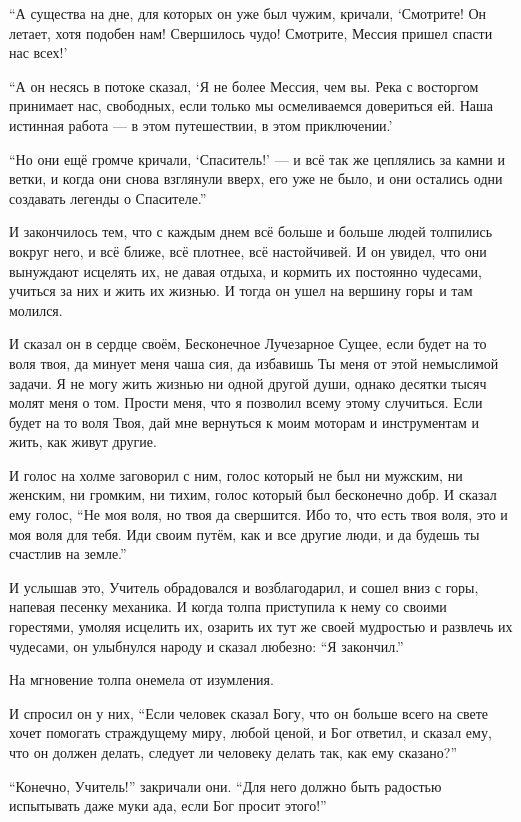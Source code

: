 ``А существа на дне, для которых он уже был чужим, кричали, `Смотрите! Он летает, хотя подобен нам! Свершилось чудо! Смотрите, Мессия пришел спасти нас всех!'

``А он несясь в потоке сказал, `Я не более Мессия, чем вы. Река с восторгом принимает нас, свободных, если только мы осмеливаемся довериться ей. Наша истинная работа --- в этом путешествии, в этом приключении.'

``Но они ещё громче кричали, `Спаситель!' --- и всё так же цеплялись за камни и ветки, и когда они снова взглянули вверх, его уже не было, и они остались одни создавать легенды о Спасителе.''

И закончилось тем, что с каждым днем всё больше и больше людей толпились вокруг него, и всё ближе,
всё плотнее, всё настойчивей. И он увидел, что они вынуждают исцелять их, не давая отдыха, и кормить их постоянно чудесами, учиться за них и жить их жизнью. И тогда он ушел на вершину горы и там молился.

И сказал он в сердце своём, Бесконечное Лучезарное Сущее, если будет на то воля твоя, да минует меня чаша сия, да избавишь Ты меня от этой немыслимой задачи. Я не могу жить жизнью ни одной другой души, однако десятки тысяч молят меня о том. Прости меня, что я позволил всему этому случиться. Если будет на то воля Твоя, дай мне вернуться к моим моторам и инструментам и жить, как живут другие.

И голос на холме заговорил с ним, голос который не был ни мужским, ни женским, ни громким, ни тихим, голос который был бесконечно добр. И сказал ему голос, ``Не моя воля, но твоя да свершится. Ибо то, что есть твоя воля, это и моя воля для тебя. Иди своим путём, как и все другие люди, и да будешь ты счастлив на земле.''

И услышав это, Учитель обрадовался и возблагодарил, и сошел вниз с горы, напевая песенку
механика. И когда толпа приступила к нему со своими горестями, умоляя исцелить их, озарить их тут
же своей мудростью и развлечь их чудесами, он улыбнулся народу и сказал любезно: ``Я закончил.''

На мгновение толпа онемела от изумления.

И спросил он у них, ``Если человек сказал Богу, что он больше всего на свете хочет помогать страждущему миру, любой ценой, и Бог ответил, и сказал ему, что он должен делать, следует ли человеку делать так, как ему сказано?''

``Конечно, Учитель!'' закричали они. ``Для него должно быть радостью испытывать даже муки ада, если Бог просит этого!''

